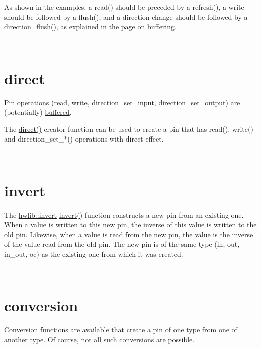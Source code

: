 \begin{DoxyCodeInclude}
\end{DoxyCodeInclude}
 As shown in the examples, a read() should be preceded by a refresh(), a write should be followed by a flush(), and a direction change should be followed by a \hyperlink{classhwlib_1_1pin__in__out_a86ef2b296683d8c0133280075c82cb51}{direction\+\_\+flush()}, as explained in the page on \hyperlink{buffering}{buffering}.

~\newline
 

\hypertarget{pins_pin-direct}{}\section{direct}\label{pins_pin-direct}
Pin operations (read, write, direction\+\_\+set\+\_\+input, direction\+\_\+set\+\_\+output) are (potentially) \hyperlink{buffering}{buffered}.

The \hyperlink{namespacehwlib_a43941b7f246ad934ee43dbfa0f5c8b5a}{direct()} creator function can be used to create a pin that has read(), write() and direction\+\_\+set\+\_\+$\ast$() operations with direct effect.


\begin{DoxyCodeInclude}
\end{DoxyCodeInclude}
 ~\newline
 

\hypertarget{pins_pin-invert}{}\section{invert}\label{pins_pin-invert}
The \hyperlink{namespacehwlib_ab619d7f70bb62112b2a04192f5103a24}{hwlib\+::invert} \hyperlink{namespacehwlib_ab619d7f70bb62112b2a04192f5103a24}{invert()} function constructs a new pin from an existing one. When a value is written to this new pin, the inverse of this value is written to the old pin. Likewise, when a value is read from the new pin, the value is the inverse of the value read from the old pin. The new pin is of the same type (in, out, in\+\_\+out, oc) as the existing one from which it was created.


\begin{DoxyCodeInclude}
\end{DoxyCodeInclude}
 ~\newline
 

\hypertarget{pins_pin-conversion}{}\section{conversion}\label{pins_pin-conversion}
Conversion functions are available that create a pin of one type from one of another type. Of course, not all such conversions are possible.

